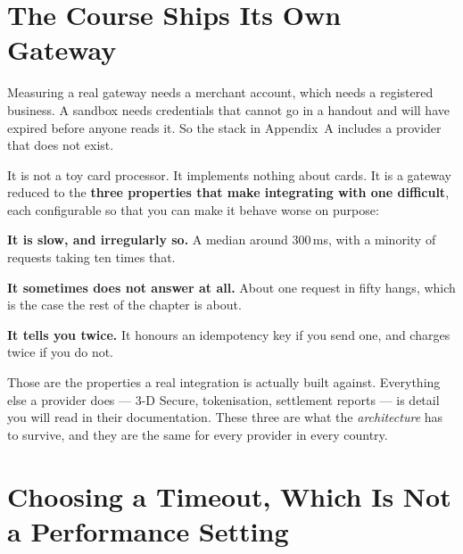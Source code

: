 \section{The Course Ships Its Own Gateway}

Measuring a real gateway needs a merchant account, which needs a registered
business. A sandbox needs credentials that cannot go in a handout and will have
expired before anyone reads it. So the stack in Appendix~A includes a provider
that does not exist.

\begin{alertbox}
It is not a toy card processor. It implements nothing about cards. It is a
gateway reduced to the \textbf{three properties that make integrating with one
difficult}, each configurable so that you can make it behave worse on purpose:

\begin{tight}
  \item \textbf{It is slow, and irregularly so.} A median around 300\,ms, with
        a minority of requests taking ten times that.
  \item \textbf{It sometimes does not answer at all.} About one request in
        fifty hangs, which is the case the rest of the chapter is about.
  \item \textbf{It tells you twice.} It honours an idempotency key if you send
        one, and charges twice if you do not.
\end{tight}

\smallskip
Those are the properties a real integration is actually built against.
Everything else a provider does --- 3-D Secure, tokenisation, settlement
reports --- is detail you will read in their documentation. These three are
what the \emph{architecture} has to survive, and they are the same for every
provider in every country.
\end{alertbox}

\section{Choosing a Timeout, Which Is Not a Performance Setting}

